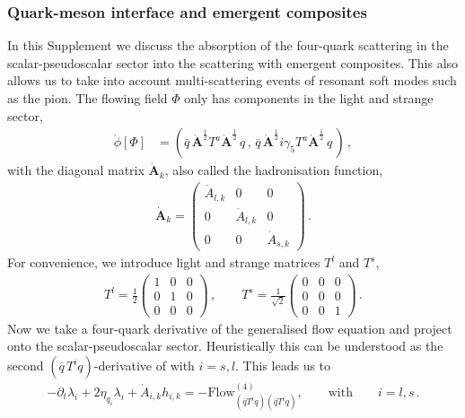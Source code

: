 \documentclass[reprint,twocolumn,superscriptaddress,preprintnumbers,amsmath,amssymb,aps,prd,floatfix]{revtex4-2}
\begin{document}
\subsubsection{Quark-meson interface and emergent composites}
\label{app:QuarkMesonInterface}

In this Supplement we discuss the absorption of the four-quark scattering in the scalar-pseudoscalar sector into the scattering with emergent composites. This also allows us to take into account multi-scattering events of resonant soft modes such as the pion. The flowing field $\dot\Phi$ only has components in the light and strange sector, 
%
\begin{align}
\dot \phi[\Phi]&=(\bar q \, \dot{\boldsymbol{A}}^{\frac{1}{2}} T^a  \dot{\boldsymbol{A}}^{\frac{1}{2}} \,  q\,, \,\bar q\, \dot{\boldsymbol{A}}^{\frac{1}{2}} i \gamma _5 T^a \dot{\boldsymbol{A}}^{\frac{1}{2}}\, q\,)\,,
\label{eq:dotphi} 
\end{align}
%
with the diagonal matrix $\dot{\boldsymbol{A}}_{k}$, also called the hadronisation function, 
%
\begin{align}
\dot{\boldsymbol{A}}_{k}=\begin{pmatrix}
\dot{A}_{l,k}&0&0\\
0&\dot{A}_{l,k}&0\\
0&0&\dot{A }_{s,k}
\end{pmatrix}\,.
\end{align}
% 
For convenience, we introduce light and strange matrices $T^l$ and $T^s$, 
%
\begin{align}
T^l=\frac{1}{2}
\begin{pmatrix}
1& 0 & 0\\
0 & 1 & 0 \\
0 & 0 & 0
\end{pmatrix}\,,
\qquad
T^s=\frac{1}{\sqrt{2}}
\begin{pmatrix}
0& 0 & 0\\
0 & 0 & 0 \\
0 & 0 & 1
\end{pmatrix}\,.
\end{align}
%
Now we take a four-quark derivative of the generalised flow equation  and project onto the 
scalar-pseudoscalar sector. Heuristically this can be understood as the second  $(\bar q\, T^i q)$-derivative of  with $i=s,l$. This leads us to 
%
\begin{align}
- \partial_t \lambda_{i} + 2\eta_{q _{i}}\lambda_{i} + \dot{A}_{i,k} h_{i,k}=-\text{Flow} _{(\bar q T^i q) (\bar q T^i q)}^{(4)},
\qquad \text{with} \qquad i=l,s\,.
\end{align}
\end{document}
